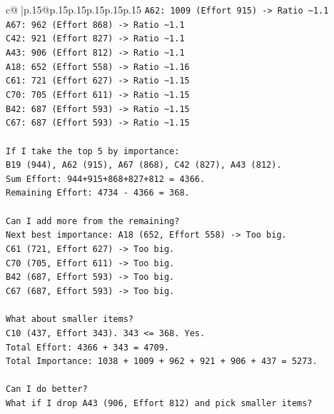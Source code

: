 \documentclass{article}
\begin{document}
{\begin{supertabular}{c@{$\;$}|p{.15\linewidth}@{}p{.15\linewidth}p{.15\linewidth}p{.15\linewidth}p{.15\linewidth}p{.15\linewidth}}
{{{\texttt{A62: 1009 (Effort 915) {-}> Ratio \textasciitilde{}1.1} \\
\texttt{A67: 962 (Effort 868) {-}> Ratio \textasciitilde{}1.1} \\
\texttt{C42: 921 (Effort 827) {-}> Ratio \textasciitilde{}1.1} \\
\texttt{A43: 906 (Effort 812) {-}> Ratio \textasciitilde{}1.1} \\
\texttt{A18: 652 (Effort 558) {-}> Ratio \textasciitilde{}1.16} \\
\texttt{C61: 721 (Effort 627) {-}> Ratio \textasciitilde{}1.15} \\
\texttt{C70: 705 (Effort 611) {-}> Ratio \textasciitilde{}1.15} \\
\texttt{B42: 687 (Effort 593) {-}> Ratio \textasciitilde{}1.15} \\
\texttt{C67: 687 (Effort 593) {-}> Ratio \textasciitilde{}1.15} \\
\\ 
\texttt{If I take the top 5 by importance:} \\
\texttt{B19 (944), A62 (915), A67 (868), C42 (827), A43 (812).} \\
\texttt{Sum Effort: 944+915+868+827+812 = 4366.} \\
\texttt{Remaining Effort: 4734 {-} 4366 = 368.} \\
\\ 
\texttt{Can I add more from the remaining?} \\
\texttt{Next best importance: A18 (652, Effort 558) {-}> Too big.} \\
\texttt{C61 (721, Effort 627) {-}> Too big.} \\
\texttt{C70 (705, Effort 611) {-}> Too big.} \\
\texttt{B42 (687, Effort 593) {-}> Too big.} \\
\texttt{C67 (687, Effort 593) {-}> Too big.} \\
\\ 
\texttt{What about smaller items?} \\
\texttt{C10 (437, Effort 343). 343 <= 368. Yes.} \\
\texttt{Total Effort: 4366 + 343 = 4709.} \\
\texttt{Total Importance: 1038 + 1009 + 962 + 921 + 906 + 437 = 5273.} \\
\\ 
\texttt{Can I do better?} \\
\texttt{What if I drop A43 (906, Effort 812) and pick smaller items?} \\
}}}
\end{supertabular}}
\end{document}
